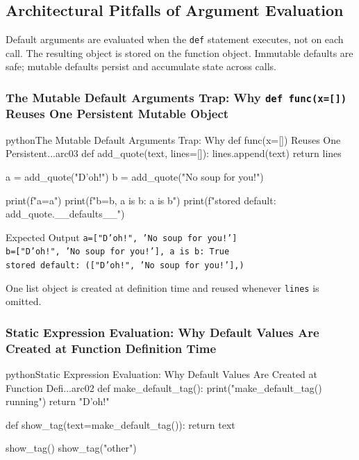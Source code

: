 \subsection{Architectural Pitfalls of Argument Evaluation}

Default arguments are evaluated when the \texttt{def} statement executes, not on each call. The resulting object is stored on the function object. Immutable defaults are safe; mutable defaults persist and accumulate state across calls.

\subsubsection{The Mutable Default Arguments Trap: Why \texttt{def func(x=[])} Reuses One Persistent Mutable Object}

\begin{codebox}[]{python}{The Mutable Default Arguments Trap: Why def func(x=[]) Reuses One Persistent...}{arc03}
def add_quote(text, lines=[]):
    lines.append(text)
    return lines

a = add_quote("D'oh!")
b = add_quote("No soup for you!")

print(f"a={a}")
print(f"b={b}, a is b: {a is b}")
print(f"stored default: {add_quote.__defaults__}")
\end{codebox}


\begin{iobox}{Expected Output}
\texttt{a=["D'oh!", 'No soup for you!']} \\
\texttt{b=["D'oh!", 'No soup for you!'], a is b: True} \\
\texttt{stored default: (["D'oh!", 'No soup for you!'],)} \\
\end{iobox}




One list object is created at definition time and reused whenever \texttt{lines} is omitted.

\subsubsection{Static Expression Evaluation: Why Default Values Are Created at Function Definition Time}

\begin{codebox}[]{python}{Static Expression Evaluation: Why Default Values Are Created at Function Defi...}{arc02}
def make_default_tag():
    print("make_default_tag() running")
    return "D'oh!"

def show_tag(text=make_default_tag()):
    return text

show_tag()
show_tag("other")
\end{codebox}


